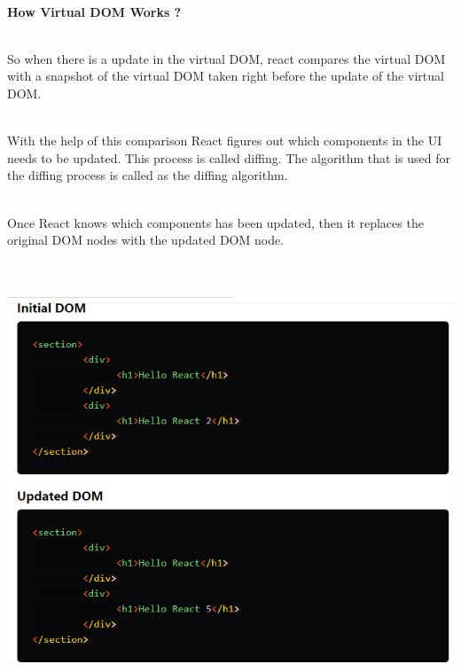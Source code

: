 \documentclass{article}
\begin{document}
\noindent 
{\bf }

\noindent 
{\bf }

\noindent 
{\bf }

\noindent 
{\bf }

\noindent 
\\
\textbf{How Virtual DOM Works ?}

\noindent 
\\
So when there is a update in the virtual DOM, react compares the virtual DOM with a snapshot of the virtual DOM taken right before the update of the virtual DOM.

\noindent 
\\
With the help of this comparison React figures out which components in the UI needs to be updated. This process is called diffing. The algorithm that is used for the diffing process is called as the diffing algorithm.

\noindent 
\\
Once React knows which components has been updated, then it replaces the original DOM nodes with the updated DOM node.

\noindent 
\newpage
{}

\noindent 
{\bf }

\noindent 
{\bf \includegraphics*[width=6.22in, height=5.14in]{IMG-06-01}}
\end{document}

